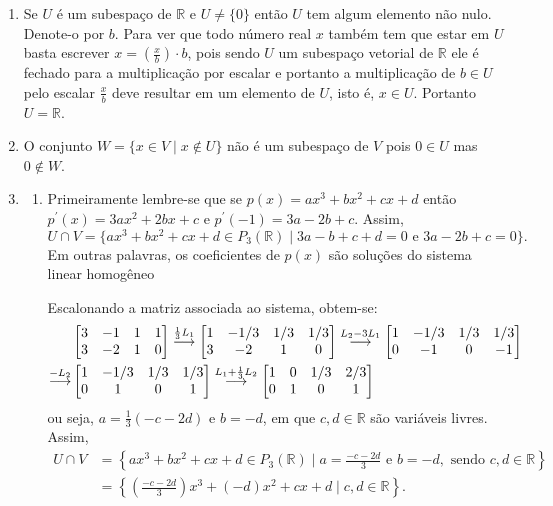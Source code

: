 \documentclass[12pt,a4paper]{article}
\newcommand*\R{\mathbb{R}}
\newcommand{\grstep}[2][\relax]{%
   \ensuremath{\mathrel{
       {\mathop{\longrightarrow}\limits^{#2\mathstrut}_{
                                     \begin{subarray}{l} #1 \end{subarray}}}}}}
\begin{document}
\begin{enumerate}
\item Se $U$ é um subespaço de $\R$ e $U \neq \{0\}$ então $U$ tem algum elemento não nulo. Denote-o por $b$. Para ver que todo número real $x$ também tem que estar em $U$ basta escrever $x = (\frac{x}{b}) \cdot b$, pois sendo $U$ um subespaço vetorial de $\R$ ele é fechado para a multiplicação por escalar e portanto a multiplicação de $b \in U$ pelo escalar $\frac{x}{b}$ deve resultar em um elemento de $U$, isto é, $x \in U$. Portanto $U = \R$.

\item O conjunto $W = \{ x \in V \mid x \not \in U \}$ não é um subespaço de $V$ pois $0 \in U$ mas $0 \not \in W$.

\item
\begin{enumerate}
\item Primeiramente lembre-se que se $p(x) = ax^3 + bx^2 + cx + d$ então $p^\prime(x) = 3ax^2 + 2bx + c$ e $p^\prime(-1) = 3a - 2b + c$. Assim,
\[
U \cap V = \{ ax^3 + bx^2 + cx + d \in P_3(\R) \mid
3a -  b + c + d = 0 \text{ e }
3a - 2b + c     = 0 \}.
\]
Em outras palavras, os coeficientes de $p(x)$ são soluções do sistema linear homogêneo

Escalonando a matriz associada ao sistema, obtem-se:
\begin{align*}
&
\begin{bmatrix}
3 & -1 & 1 & 1\\
3 & -2 & 1 & 0
\end{bmatrix}
\grstep{ \frac{1}{3} L_1 }
\begin{bmatrix}
1 & -1/3 & 1/3 & 1/3 \\
3 & -2 & 1 & 0
\end{bmatrix}
\grstep{ L_2 - 3L_1 }
\begin{bmatrix}
1 & -1/3 & 1/3 & 1/3 \\
0 & -1 & 0 & -1
\end{bmatrix}\\
\grstep{ -L_2 }
&
\begin{bmatrix}
1 & -1/3 & 1/3 & 1/3 \\
0 & 1 & 0 & 1
\end{bmatrix}
\grstep{ L_1 +\frac{1}{3}L_2 }
\begin{bmatrix}
1 & 0 & 1/3 & 2/3 \\
0 & 1 & 0 & 1
\end{bmatrix}
\end{align*}
ou seja, $a = \frac{1}{3} (-c-2 d)$ e $b = -d$, em que $c,d \in \R$ são variáveis livres. Assim,
\begin{align*}
U \cap V
& = \left\{ ax^3 + bx^2 + cx + d \in P_3(\R) \mid
a = \frac{-c-2 d}{3}
\text{ e }
b = -d, \text{ sendo } c,d \in \R \right\} \\
& = \left\{ \left(\frac{-c-2 d}{3}\right)x^3 + (-d)x^2 + cx + d \mid c,d \in \R \right\}.
\end{align*}


\end{enumerate}
\end{enumerate}
\end{document}
